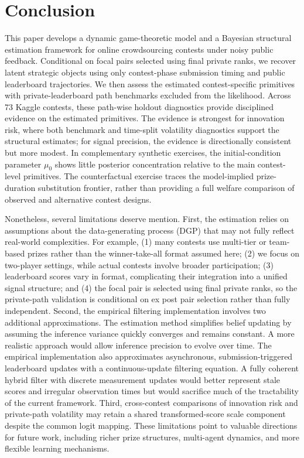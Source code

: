 \documentclass[mnsc]{informs3}
\begin{document}
\section{Conclusion}

This paper develops a dynamic game-theoretic model and a Bayesian structural estimation framework for online crowdsourcing contests under noisy public feedback.
Conditional on focal pairs selected using final private ranks, we recover latent strategic objects using only contest-phase submission timing and public leaderboard trajectories. We then assess the estimated contest-specific primitives with private-leaderboard path benchmarks excluded from the likelihood.
Across 73 Kaggle contests, these path-wise holdout diagnostics provide disciplined evidence on the estimated primitives.
The evidence is strongest for innovation risk, where both benchmark and time-split volatility diagnostics support the structural estimates; for signal precision, the evidence is directionally consistent but more modest.
In complementary synthetic exercises, the initial-condition parameter $\mu_0$ shows little posterior concentration relative to the main contest-level primitives.
The counterfactual exercise traces the model-implied prize-duration substitution frontier, rather than providing a full welfare comparison of observed and alternative contest designs.


Nonetheless, several limitations deserve mention.
First, the estimation relies on assumptions about the data-generating process (DGP) that may not fully reflect real-world complexities.
For example,
(1) many contests use multi-tier or team-based prizes rather than the winner-take-all format assumed here;
(2) we focus on two-player settings, while actual contests involve broader participation;
(3) leaderboard scores vary in format, complicating their integration into a unified signal structure; and
(4) the focal pair is selected using final private ranks, so the private-path validation is conditional on ex post pair selection rather than fully independent.
Second, the empirical filtering implementation involves two additional approximations. The estimation method simplifies belief updating by assuming the inference variance quickly converges and remains constant.
A more realistic approach would allow inference precision to evolve over time.
The empirical implementation also approximates asynchronous, submission-triggered leaderboard updates with a continuous-update filtering equation. A fully coherent hybrid filter with discrete measurement updates would better represent stale scores and irregular observation times but would sacrifice much of the tractability of the current framework.
Third, cross-contest comparisons of innovation risk and private-path volatility may retain a shared transformed-score scale component despite the common logit mapping.
These limitations point to valuable directions for future work, including richer prize structures, multi-agent dynamics, and more flexible learning mechanisms.
\end{document}
